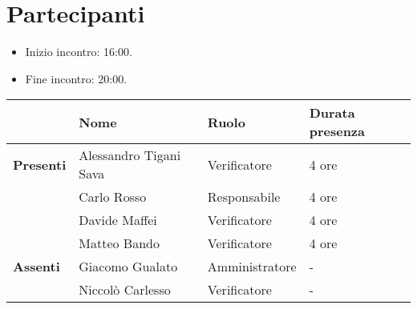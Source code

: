 \section*{Partecipanti}

\begin{itemize}
	\item Inizio incontro: 16:00.
	\item Fine incontro: 20:00.
\end{itemize}


\begin{center}
	\begin{tabular}{llll}
		                  & \textbf{Nome}          & \textbf{Ruolo} & \textbf{Durata presenza}	\\
		\hline
		\textbf{Presenti} & Alessandro Tigani Sava & Verificatore	& 4 ore						\\
		                  & Carlo Rosso            & Responsabile	& 4 ore             		\\
		                  & Davide Maffei          & Verificatore   & 4 ore             		\\
		                  & Matteo Bando           & Verificatore   & 4 ore             		\\
		\hline
		\textbf{Assenti}  & Giacomo Gualato        & Amministratore & -							\\
		                  & Niccolò Carlesso       & Verificatore   & -							\\
	\end{tabular}
\end{center}
